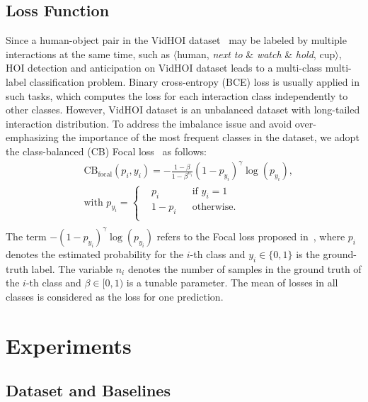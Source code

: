 \documentclass[times,twocolumn,final,authoryear]{elsarticle}
\begin{document}
\subsection{Loss Function}
Since a human-object pair in the VidHOI dataset~\citep{hoi_v_set:VidHOI} may be labeled by multiple interactions at the same time, such as $\langle$human, \emph{next to} \& \emph{watch} \& \emph{hold}, cup$\rangle$, HOI detection and anticipation on VidHOI dataset leads to a multi-class multi-label classification problem. Binary cross-entropy (BCE) loss is usually applied in such tasks, which computes the loss for each interaction class independently to other classes. However, VidHOI dataset is an unbalanced dataset with long-tailed interaction distribution. To address the imbalance issue and avoid over-emphasizing the importance of the most frequent classes in the dataset, we adopt the class-balanced (CB) Focal loss~\citep{loss:cb} as follows: 
\begin{equation}
    \begin{aligned}
        & \text{CB}_\text{focal}(p_i, y_i) = -\frac{1-\beta}{1-\beta^{n_i}}(1-p_{y_i})^\gamma\log(p_{y_i})\text{,} \\
        & \text{with } p_{y_i}=\left\{ 
            \begin{aligned}
                & p_i    && \text{if }y_i=1 \\
                & 1-p_i  && \text{otherwise}\text{.} \\
            \end{aligned} \right. \\
        \end{aligned}
    \label{eq:cb_focal_loss}
\end{equation}
The term $-(1-p_{y_i})^\gamma\log(p_{y_i})$ refers to the Focal loss proposed in~\citep{loss:focal}, where $p_i$ denotes the estimated probability for the $i$-th class and $y_i \in \{0, 1\}$ is the ground-truth label. The variable $n_i$ denotes the number of samples in the ground truth of the $i$-th class and $\beta \in [0, 1)$ is a tunable parameter. The mean of losses in all classes is considered as the loss for one prediction.


\section{Experiments}
\subsection{Dataset and Baselines}
\end{document}
